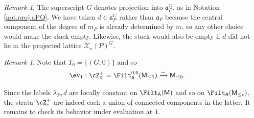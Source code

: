 \documentclass[openany]{amsbook}
\theoremstyle{definition}
\theoremstyle{remark}
\newtheorem{remark}[theorem]{Remark}
\numberwithin{equation}{section}
\newcommand{\cX}{\mathcal{X}}
\renewcommand{\-}{\operatorname{-}}
\renewcommand{\a}{\mathfrak{a}}
\newcommand{\bM}{\mathsf{M}}
\newcommand{\bA}{\mathsf{A}}
\begin{document}
\begin{remark}
    The superscript $G$ denotes projection into $\a_P^G$, as in Notation \ref{not.proj.aPQ}. We have taken $d \in \a_P^G$ rather than $\a_P$ because the central component of the degree of $m_P$ is already determined by $m$, so any other choice would make the stack empty. Likewise, the stack would also be empty if $d$ did not lie in the projected lattice $\cX_\star(P)^G$. 
\end{remark}

\begin{remark}
Note that $T_0 = \{(G, 0)\}$ and so
$$
    \ev_1 : \cZ^+_0 = \Filt_{\bA}^{0,0}(\bM_{\le 0}) \xrightarrow{\sim} \bM_{\le 0}.
$$
\end{remark}

Since the labels $\lambda_P, d$ are locally constant on $\Filt_{\bA}(\bM)$ and so on $\Filt_{\bA}(\bM_{\le c})$, the strata $\cZ^+_c$ are indeed each a union of connected components in the latter. It remains to check its behavior under evaluation at $1$.
\end{document}
